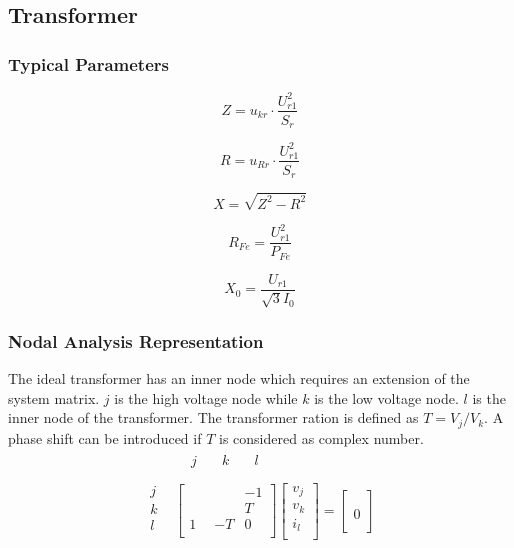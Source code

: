 \subsection{Transformer}
\subsubsection{Typical Parameters}

\begin{equation}
	Z = u_{kr} \cdot \frac{U_{r1}^2}{S_{r}}
\end{equation}

\begin{equation}
	R = u_{Rr} \cdot \frac{U_{r1}^2}{S_{r}}
\end{equation}

\begin{equation}
	X = \sqrt{Z^2-R^2}
\end{equation}

\begin{equation}
	R_{Fe} = \frac{U_{r1}^2}{P_{Fe}}
\end{equation}

\begin{equation}
	X_{0} = \frac{U_{r1}}{\sqrt{3} I_{0}}
\end{equation}

\subsubsection{Nodal Analysis Representation}

The ideal transformer has an inner node which requires an extension of the system matrix. $j$ is the high voltage node while $k$ is the low voltage node. $l$ is the inner node of the transformer. The transformer ration is defined as $T=V_{j}/V_{k}$. A phase shift can be introduced if $T$ is considered as complex number.
\begin{align}
	& \begin{matrix}
	&  j & \quad k & \quad l\\
	\end{matrix}\\
	\begin{matrix}
	j\\
	k\\
  l\\
	\end{matrix}
	& \begin{bmatrix}
	\quad & \quad & -1\\
	& & T\\
	1 & -T & 0\\
	\end{bmatrix}
	\begin{bmatrix}
	v_j\\
	v_k\\
	i_{l}\\
	\end{bmatrix}
	=
	\begin{bmatrix}
	\\
	\\
	0\\
	\end{bmatrix}	
\end{align}
